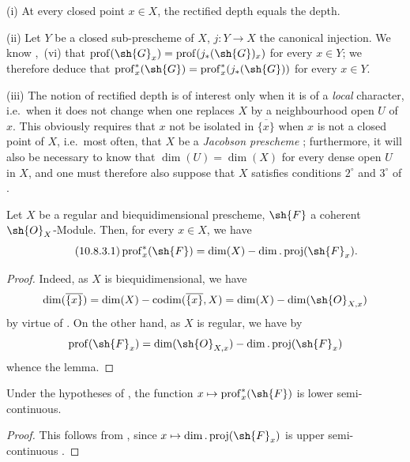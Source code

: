 \begin{remarks}[10.8.2]
\label{IV.10.8.2}
(i) At every closed point $x\in X$, the rectified depth equals the depth.

(ii) Let $Y$ be a closed sub-prescheme of $X$, $j:Y\to X$ the canonical injection.
We know ,~(vi) that $\operatorname{prof}(\sh{G}_x)=\operatorname{prof}(j_*(\sh{G})_x)$ for every $x\in Y$; we therefore deduce that $\operatorname{prof}^*_x(\sh{G})=\operatorname{prof}^*_x(j_*(\sh{G}))$ for every $x\in Y$.

(iii) The notion of rectified depth is of interest only when it is of a \emph{local} character, i.e.\ when it does not change when one replaces $X$ by a neighbourhood open $U$ of $x$.
This obviously requires that $x$ not be isolated in $\overline{\{x\}}$ when $x$ is not a closed point of $X$, i.e.\ most often, that $X$ be a \emph{Jacobson prescheme} ; furthermore, it will also be necessary to know that $\dim(U)=\dim(X)$ for every dense open $U$ in $X$, and one must therefore also suppose that $X$ satisfies conditions $2^\circ$ and $3^\circ$ of .
\end{remarks}

\begin{lemma}[10.8.3]
\label{IV.10.8.3}
Let $X$ be a regular and biequidimensional prescheme, $\sh{F}$ a coherent $\sh{O}_X$-Module.
Then, for every $x\in X$, we have
\begin{equation}
\label{IV.10.8.3.1}
\tag{10.8.3.1}
\operatorname{prof}^*_x(\sh{F})=\dim(X)-\dim.\operatorname{proj}(\sh{F}_x).
\end{equation}
\end{lemma}

\begin{proof}
Indeed, as $X$ is biequidimensional, we have 
\[
  \dim(\overline{\{x\}})=\dim(X)-\operatorname{codim}(\overline{\{x\}},X)=\dim(X)-\dim(\sh{O}_{X,x})
\]
by virtue of .
On the other hand, as $X$ is regular, we have by 
\[
  \operatorname{prof}(\sh{F}_x)=\dim(\sh{O}_{X,x})-\dim.\operatorname{proj}(\sh{F}_x)
\]
whence the lemma.
\end{proof}

\begin{corollary}[10.8.4]
\label{IV.10.8.4}
Under the hypotheses of , the function $x\mapsto\operatorname{prof}^*_x(\sh{F})$ is lower semi-continuous.
\end{corollary}

\begin{proof}
This follows from , since $x\mapsto\dim.\operatorname{proj}(\sh{F}_x)$ is upper semi-continuous .
\end{proof}

